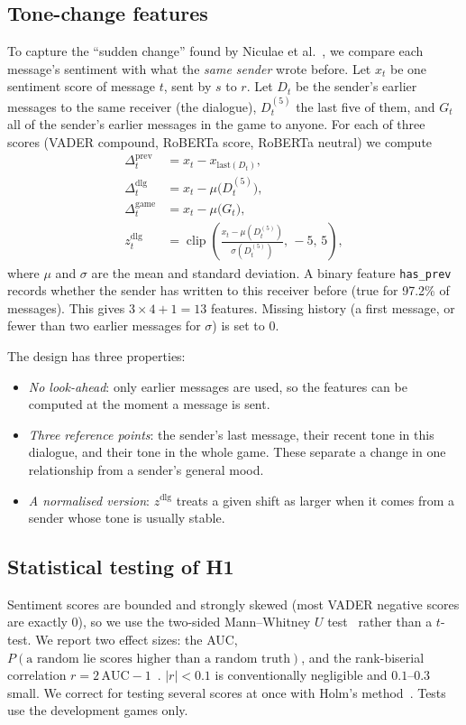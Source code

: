 \documentclass[conference]{IEEEtran}
\begin{document}
\subsection{Tone-change features}
\label{sec:design-tone}
To capture the ``sudden change'' found by Niculae et al.~\cite{niculae2015harbingers}, we compare each message's sentiment with what the \emph{same sender} wrote before. Let $x_t$ be one sentiment score of message $t$, sent by $s$ to $r$. Let $D_{t}$ be the sender's earlier messages to the same receiver (the dialogue), $D^{(5)}_{t}$ the last five of them, and $G_{t}$ all of the sender's earlier messages in the game to anyone. For each of three scores (VADER compound, RoBERTa score, RoBERTa neutral) we compute
\begin{align}
\Delta^{\text{prev}}_t &= x_t - x_{\text{last}(D_t)}, \\
\Delta^{\text{dlg}}_t  &= x_t - \mu\bigl(D^{(5)}_t\bigr), \\
\Delta^{\text{game}}_t &= x_t - \mu\bigl(G_t\bigr), \\
z^{\text{dlg}}_t       &= \operatorname{clip}\!\left(\frac{x_t - \mu(D^{(5)}_t)}{\sigma(D^{(5)}_t)},\,-5,\,5\right),
\end{align}
where $\mu$ and $\sigma$ are the mean and standard deviation. A binary feature \texttt{has\_prev} records whether the sender has written to this receiver before (true for 97.2\% of messages). This gives $3 \times 4 + 1 = 13$ features. Missing history (a first message, or fewer than two earlier messages for $\sigma$) is set to 0.

The design has three properties:
\begin{itemize}
\item \emph{No look-ahead}: only earlier messages are used, so the features can be computed at the moment a message is sent.
\item \emph{Three reference points}: the sender's last message, their recent tone in this dialogue, and their tone in the whole game. These separate a change in one relationship from a sender's general mood.
\item \emph{A normalised version}: $z^{\text{dlg}}$ treats a given shift as larger when it comes from a sender whose tone is usually stable.
\end{itemize}

\subsection{Statistical testing of H1}
Sentiment scores are bounded and strongly skewed (most VADER negative scores are exactly 0), so we use the two-sided Mann--Whitney $U$ test~\cite{mann1947test} rather than a $t$-test. We report two effect sizes: the AUC, $P(\text{a random lie scores higher than a random truth})$, and the rank-biserial correlation $r = 2\,\text{AUC} - 1$~\cite{kerby2014simple}. $|r| < 0.1$ is conventionally negligible and $0.1$--$0.3$ small. We correct for testing several scores at once with Holm's method~\cite{holm1979simple}. Tests use the development games only.
\end{document}
